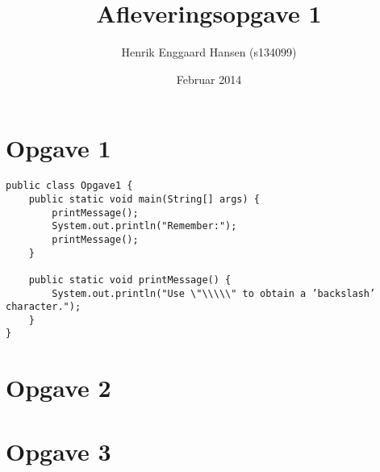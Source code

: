 \documentclass{article}
\begin{document}
\title{Afleveringsopgave 1}
\author{Henrik Enggaard Hansen (s134099)}
\date{Februar 2014}
\maketitle

\section*{Opgave 1}

\begin{verbatim}
public class Opgave1 {
	public static void main(String[] args) {
		printMessage();
		System.out.println("Remember:");
		printMessage();
	}

	public static void printMessage() {
		System.out.println("Use \"\\\\\" to obtain a ’backslash’ character.");
	}
}
\end{verbatim}

\section*{Opgave 2}

\section*{Opgave 3}
\end{document}

